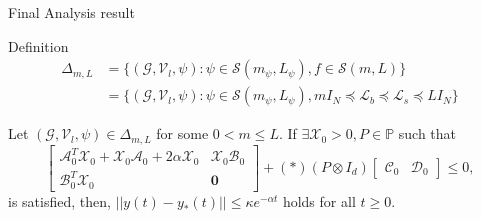 \documentclass{beamer}
\begin{document}
\begin{frame}{Final Analysis result}
	\begin{block}{Definition}
	\begin{equation}
		\begin{split}
		\Delta_{m,L}&=\{(\mathcal{G},\mathcal{V}_l,\psi):\psi \in \mathcal{S}(m_{\psi},L_{\psi}),f \in \mathcal{S}(m,L) \}\\
			&=\{(\mathcal{G},\mathcal{V}_l,\psi):\psi \in \mathcal{S}(m_{\psi},L_{\psi}),m I_N \preceq  \mathcal{L}_b \preceq \mathcal{L}_s \preceq L I_N \}
		\end{split}		
	\end{equation}
	\end{block}
\pause 
\begin{theorem}
	Let $(\mathcal{G},\mathcal{V}_l,\psi) \in \Delta_{m,L}$ for some $0<m\leq L$.
	If $\exists \mathcal{X}_0>0,P \in \mathbb{P}$ such that 
	\begin{equation}%
		\begin{bmatrix}
			\mathcal{A}_0^T\mathcal{X}_0+\mathcal{X}_0\mathcal{A}_0+2\alpha \mathcal{X}_0  & \mathcal{X}_0\mathcal{B}_0 \\
			\mathcal{B}_0^T\mathcal{X}_0    & \mathbf{0}
		\end{bmatrix}
		+
		(*)
		( P\otimes I_{d})
		\begin{bmatrix}
			\mathcal{C}_0 & \mathcal{D}_0 
		\end{bmatrix}
		\leq 
		0,
	\end{equation} is satisfied, then, $||y(t)-y_*(t)||\leq \kappa e^{-\alpha t}$ holds for all $t\geq 0$.
\end{theorem}
\end{frame}
\end{document}
